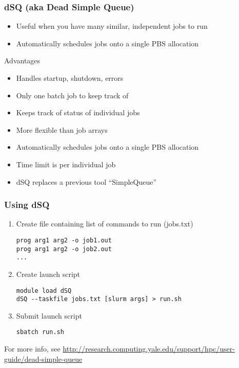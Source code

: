 \documentclass[10pt]{beamer}
\begin{document}
\begin{frame}[fragile]
\frametitle{dSQ (aka Dead Simple Queue)}

\begin{itemize}
\item Useful when you have many similar, independent jobs to run
\item Automatically schedules jobs onto a single PBS allocation
\end{itemize}

Advantages

\begin{itemize}
\item Handles startup, shutdown, errors
\item Only one batch job to keep track of
\item Keeps track of status of individual jobs
\item More flexible than job arrays
\item Automatically schedules jobs onto a single PBS allocation
\item Time limit is per individual job
\item dSQ replaces a previous tool ``SimpleQueue''
\end{itemize}

\end{frame}

\begin{frame}[fragile]
\frametitle{Using dSQ}

\begin{enumerate}
\item Create file containing list of commands to run (jobs.txt)
\begin{verbatim}
prog arg1 arg2 -o job1.out  
prog arg1 arg2 -o job2.out  
...
\end{verbatim}
\item Create launch script
\begin{verbatim}
module load dSQ
dSQ --taskfile jobs.txt [slurm args] > run.sh
\end{verbatim}

\item Submit launch script
\begin{verbatim}
sbatch run.sh  
\end{verbatim}
\end{enumerate}

For more info, see \url{http://research.computing.yale.edu/support/hpc/user-guide/dead-simple-queue}

\end{frame}
\end{document}
